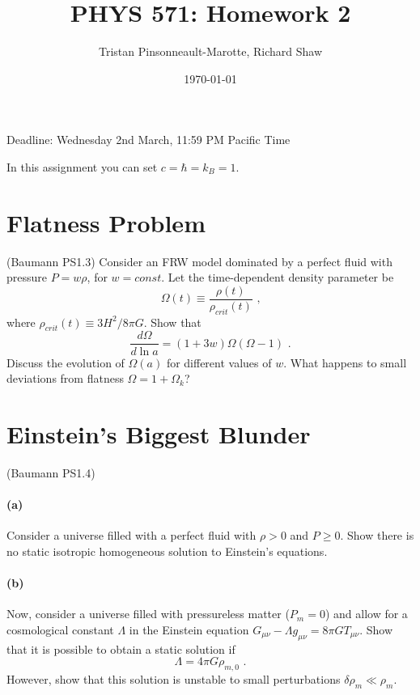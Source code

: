 \documentclass[12pt]{article}
\author{Tristan Pinsonneault-Marotte, Richard Shaw}
\title{PHYS 571: Homework 2}
\date{\today}
\begin{document}
\maketitle

Deadline: Wednesday 2nd March, 11:59 PM Pacific Time

In this assignment you can set $c = \hbar = k_B = 1$.

\section{Flatness Problem}

(Baumann PS1.3) Consider an FRW model dominated by a perfect fluid with pressure
$P = w\rho$, for $w = const$. Let the time-dependent density parameter be
\begin{equation}
    \Omega(t) \equiv \frac{\rho(t)}{\rho_{crit}(t)} \text{ ,}
\end{equation}
where $\rho_{crit}(t) \equiv 3 H^2 / 8 \pi G$. Show that
\begin{equation}
    \frac{d \Omega}{d \ln a} = \left(1 +  3w\right) \Omega
    \left(\Omega - 1\right) \text{ .}
\end{equation}
Discuss the evolution of $\Omega(a)$ for different values of $w$. What happens
to small deviations from flatness $\Omega = 1 + \Omega_k$?


\section{Einstein's Biggest Blunder}

(Baumann PS1.4)

\paragraph{(a)} Consider a universe filled with a perfect fluid with $\rho > 0$
and $P \geq 0$. Show there is no static isotropic homogeneous solution to
Einstein's equations.

\paragraph{(b)} Now, consider a universe filled with pressureless matter ($P_m =
0$) and allow for a cosmological constant $\Lambda$ in the Einstein equation
$G_{\mu\nu} - \Lambda g_{\mu\nu} = 8\pi G T_{\mu\nu}$. Show that it is possible to obtain a static solution if
\begin{equation}
    \Lambda = 4 \pi G \rho_{m,0} \text{ .}
\end{equation}
However, show that this solution is unstable to small perturbations $\delta
\rho_m \ll \rho_m$.
\end{document}
